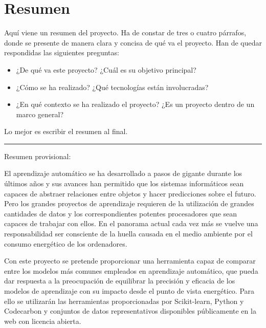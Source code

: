 \documentclass[a4paper, 12pt, oneside]{book}
\begin{document}



\chapter*{Resumen}
\thispagestyle{empty}

Aquí viene un resumen del proyecto.
Ha de constar de tres o cuatro párrafos, donde se presente de manera clara y concisa de qué va el proyecto. 
Han de quedar respondidas las siguientes preguntas:

\begin{itemize}
  \item ¿De qué va este proyecto? ¿Cuál es su objetivo principal?
  \item ¿Cómo se ha realizado? ¿Qué tecnologías están involucradas?
  \item ¿En qué contexto se ha realizado el proyecto? ¿Es un proyecto dentro de un marco general?
\end{itemize}

Lo mejor es escribir el resumen al final.
\\\noindent\rule{\textwidth}{0.4pt}
Resumen provisional:

El aprendizaje automático se ha desarrollado a pasos de gigante durante los últimos años y sus avances han permitido que los sistemas informáticos sean capaces de abstraer relaciones entre objetos y hacer predicciones sobre el futuro. Pero los grandes proyectos de aprendizaje requieren de la utilización de grandes cantidades de datos y los correspondientes potentes procesadores que sean capaces de trabajar con ellos. En el panorama actual cada vez más se vuelve una responsabilidad ser consciente de la huella causada en el medio ambiente por el consumo energético de los ordenadores.

Con este proyecto se pretende proporcionar una herramienta capaz de comparar entre los modelos más comunes empleados en aprendizaje automático, que pueda dar respuesta a la preocupación de equilibrar la precisión y eficacia de los modelos de aprendizaje con su impacto desde el punto de vista energético. Para ello se utilizarán las herramientas proporcionadas por Scikit-learn, Python y Codecarbon y conjuntos de datos representativos disponibles públicamente en la web con licencia abierta.
\end{document}
